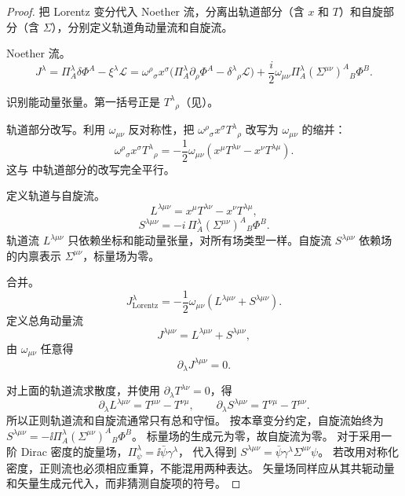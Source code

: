 \begin{proof}
把 Lorentz 变分代入 Noether 流，分离出轨道部分（含 $x$ 和 $T$）和自旋部分（含 $\Sigma$），分别定义轨道角动量流和自旋流。

Noether 流。
\begin{equation*}
J^\lambda=\Pi_A^\lambda\delta\Phi^A-\xi^\lambda\mathcal{L}
=\omega^\rho{}_\sigma x^\sigma\big(\Pi_A^\lambda\partial_\rho\Phi^A-\delta^\lambda{}_\rho\mathcal{L}\big)+\frac{i}{2}\omega_{\mu\nu}\Pi_A^\lambda(\Sigma^{\mu\nu})^A{}_B\Phi^B.
\end{equation*}

识别能动量张量。第一括号正是 $T^\lambda{}_\rho$（见）。

轨道部分改写。利用 $\omega_{\mu\nu}$ 反对称性，把 $\omega^\rho{}_\sigma x^\sigma T^\lambda{}_\rho$ 改写为 $\omega_{\mu\nu}$ 的缩并：
\begin{equation*}
\omega^\rho{}_\sigma x^\sigma T^\lambda{}_\rho=-\frac{1}{2}\omega_{\mu\nu}(x^\mu T^{\lambda\nu}-x^\nu T^{\lambda\mu}).
\end{equation*}
这与 中轨道部分的改写完全平行。

定义轨道与自旋流。
\begin{equation}\label{eq:ms-poincare-L-current}
L^{\lambda\mu\nu}=x^\mu T^{\lambda\nu}-x^\nu T^{\lambda\mu},
\end{equation}
\begin{equation}\label{eq:ms-poincare-S-current}
S^{\lambda\mu\nu}=-i\,\Pi_A^\lambda(\Sigma^{\mu\nu})^A{}_B\Phi^B.
\end{equation}
轨道流 $L^{\lambda\mu\nu}$ 只依赖坐标和能动量张量，对所有场类型一样。自旋流 $S^{\lambda\mu\nu}$ 依赖场的内禀表示 $\Sigma^{\mu\nu}$，标量场为零。

合并。
\begin{equation*}
J^\lambda_{\text{Lorentz}}=-\frac{1}{2}\omega_{\mu\nu}(L^{\lambda\mu\nu}+S^{\lambda\mu\nu}).
\end{equation*}
定义总角动量流
\begin{equation}\label{eq:ms-poincare-J-total}
J^{\lambda\mu\nu}=L^{\lambda\mu\nu}+S^{\lambda\mu\nu},
\end{equation}
由 $\omega_{\mu\nu}$ 任意得
\begin{equation}\label{eq:ms-poincare-J-conservation}
{\partial_\lambda J^{\lambda\mu\nu}=0.}
\end{equation}

对上面的轨道流求散度，并使用 $\partial_\lambda T^{\lambda\nu}=0$，得
\[
\partial_\lambda L^{\lambda\mu\nu}=T^{\mu\nu}-T^{\nu\mu},\qquad
\partial_\lambda S^{\lambda\mu\nu}=T^{\nu\mu}-T^{\mu\nu}.
\]
所以正则轨道流和自旋流通常只有总和守恒。
按本章变分约定，自旋流始终为
$S^{\lambda\mu\nu}=-\ii\Pi_A^\lambda(\Sigma^{\mu\nu})^A{}_B\Phi^B$。
标量场的生成元为零，故自旋流为零。
对于采用一阶 Dirac 密度的旋量场，$\Pi_\psi^\lambda=\ii\bar\psi\gamma^\lambda$，
代入得到 $S^{\lambda\mu\nu}=\bar\psi\gamma^\lambda\Sigma^{\mu\nu}\psi$。
若改用对称化密度，正则流也必须相应重算，不能混用两种表达。
矢量场同样应从其共轭动量和矢量生成元代入，而非猜测自旋项的符号。


\end{proof}
